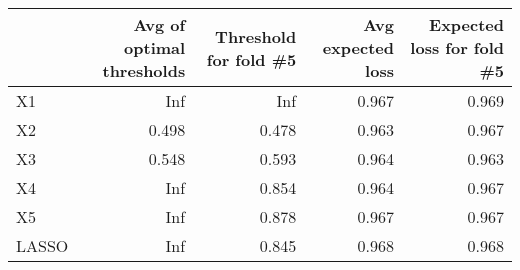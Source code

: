 
\begin{tabular}{lrrrr}
\toprule
  & Avg of optimal thresholds & Threshold for fold \#5 & Avg expected loss & Expected loss for fold \#5\\
\midrule
X1 & Inf & Inf & 0.967 & 0.969\\
X2 & 0.498 & 0.478 & 0.963 & 0.967\\
X3 & 0.548 & 0.593 & 0.964 & 0.963\\
X4 & Inf & 0.854 & 0.964 & 0.967\\
X5 & Inf & 0.878 & 0.967 & 0.967\\
LASSO & Inf & 0.845 & 0.968 & 0.968\\
\bottomrule
\end{tabular}